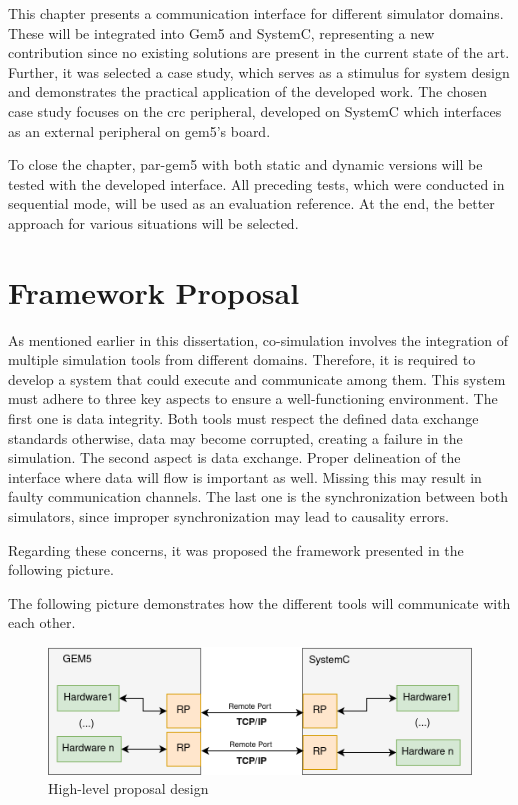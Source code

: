 
This chapter presents a communication interface for different simulator domains. These will be integrated into Gem5 and SystemC, representing 
a new contribution since no existing solutions are present in the current state of the art. Further, it was selected a 
case study, which serves as a stimulus for system design and demonstrates 
the practical application of the developed work. The chosen case study focuses on the \gls{crc} peripheral, developed on SystemC which interfaces 
as an external peripheral on gem5's board. 

To close the chapter, par-gem5 with both static and dynamic versions will be tested with the developed interface. 
All preceding tests, which were conducted in sequential mode, will be used as an evaluation reference. At the end, the 
better approach for various situations will be selected.

\section{Framework Proposal}

As mentioned earlier in this dissertation, co-simulation involves the integration of multiple simulation tools from different
domains. Therefore, it is required to develop a system that could execute and communicate among them. This system must adhere to three key 
aspects to ensure a well-functioning environment. The first one is data integrity. Both tools must respect the defined data exchange standards 
otherwise, data may become corrupted, creating a failure in the simulation. The second aspect is data exchange. Proper delineation of the 
interface where data will flow is important as well. Missing this may result in faulty communication channels. The last one is the synchronization 
between both simulators, since improper synchronization may lead to causality errors.

Regarding these concerns, it was proposed the framework presented in the following picture. %


The following picture
demonstrates how the different tools will communicate with each other.

\begin{figure}[H]
	\centering
 	\includegraphics[width=0.8\linewidth]{Images/CoSimDesignSimplified.png}
 	\caption{High-level proposal design}
	 \label{fig_CoSimDesignSimplified}
\end{figure}

